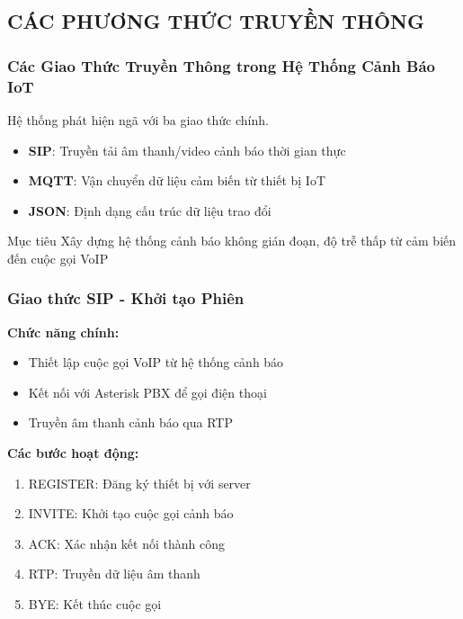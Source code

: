 \subsection{CÁC PHƯƠNG THỨC TRUYỀN THÔNG}

\begin{frame}
\frametitle{Các Giao Thức Truyền Thông trong Hệ Thống Cảnh Báo IoT}
\begin{center}
\Large Hệ thống phát hiện ngã với ba giao thức chính.
\end{center}

\begin{itemize}
\item \textbf{SIP}: Truyền tải âm thanh/video cảnh báo thời gian thực
\item \textbf{MQTT}: Vận chuyển dữ liệu cảm biến từ thiết bị IoT
\item \textbf{JSON}: Định dạng cấu trúc dữ liệu trao đổi
\end{itemize}

\begin{block}{Mục tiêu}
Xây dựng hệ thống cảnh báo không gián đoạn, độ trễ thấp từ cảm biến đến cuộc gọi VoIP
\end{block}
\end{frame}

\begin{frame}
\frametitle{Giao thức SIP - Khởi tạo Phiên}
\textbf{Chức năng chính:}
\begin{itemize}
\item Thiết lập cuộc gọi VoIP từ hệ thống cảnh báo
\item Kết nối với Asterisk PBX để gọi điện thoại
\item Truyền âm thanh cảnh báo qua RTP
\end{itemize}

\textbf{Các bước hoạt động:}
\begin{enumerate}
\item REGISTER: Đăng ký thiết bị với server
\item INVITE: Khởi tạo cuộc gọi cảnh báo
\item ACK: Xác nhận kết nối thành công
\item RTP: Truyền dữ liệu âm thanh
\item BYE: Kết thúc cuộc gọi
\end{enumerate}
\end{frame}

